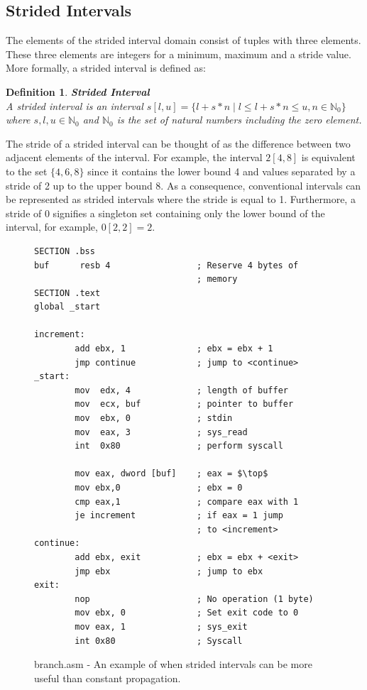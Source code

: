 \documentclass{kththesis}
\newtheorem*{definition}{Definition}
\newcommand{\fbcomment}[1]{{#1}}
\renewcommand{\fbcomment}[1]{}
\begin{document}
\subsection{Strided Intervals}\label{sec:absDomInt}
\fbcomment{\color{red}Goal: Introduce strided intervals and show an example of when it is more useful than constant propagation.}
The elements of the strided interval domain consist of tuples with three elements. These three elements are integers for a minimum, maximum and a stride value. More formally, a strided interval is defined as: 
\begin{definition}\textbf{Strided Interval}\\
A strided interval is an interval $s[l,u]=\{l + s * n\;|\;l \leq l + s * n \leq u, n \in \mathbb{N}_0 \}$ where $s,l,u \in \mathbb{N}_0$ and $\mathbb{N}_0$ is the set of natural numbers including the zero element.
\end{definition}
\noindent The stride of a strided interval can be thought of as the difference between two adjacent elements of the interval. For example, the interval $2[4,8]$ is equivalent to the set $\{4,6,8\}$ since it contains the lower bound 4 and values separated by a stride of 2 up to the upper bound 8. As a consequence, conventional intervals can be represented as strided intervals where the stride is equal to 1. Furthermore, a stride of 0 signifies a singleton set containing only the lower bound of the interval, for example, $0[2,2] = 2$.
\begin{figure}[ht]
    \centering
\begin{tcolorbox}
\begin{verbatim}
SECTION .bss
buf      resb 4                 ; Reserve 4 bytes of
                                ; memory
SECTION .text
global _start

increment:
        add ebx, 1              ; ebx = ebx + 1
        jmp continue            ; jump to <continue>
_start:
        mov  edx, 4             ; length of buffer
        mov  ecx, buf           ; pointer to buffer
        mov  ebx, 0             ; stdin
        mov  eax, 3             ; sys_read
        int  0x80               ; perform syscall

        mov eax, dword [buf]    ; eax = $\top$
        mov ebx,0               ; ebx = 0
        cmp eax,1               ; compare eax with 1
        je increment            ; if eax = 1 jump
                                ; to <increment>
continue:
        add ebx, exit           ; ebx = ebx + <exit>
        jmp ebx                 ; jump to ebx
exit:
        nop                     ; No operation (1 byte)
        mov ebx, 0              ; Set exit code to 0
        mov eax, 1              ; sys_exit
        int 0x80                ; Syscall
\end{verbatim}
\end{tcolorbox}
\caption{branch.asm - An example of when strided intervals can be more useful than constant propagation.}
    \label{fig:branch.asm}
\end{figure}
\end{document}
